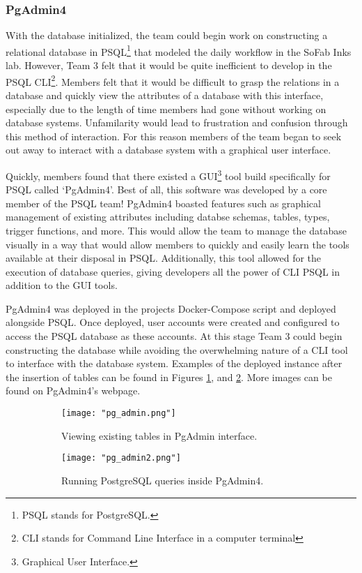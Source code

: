 \documentclass{article}
\begin{document}
\subsubsection{PgAdmin4}
With the database initialized, the team could begin work on constructing a relational database in PSQL\footnote{PSQL stands for PostgreSQL.}
that modeled the daily workflow in the SoFab Inks lab. However, Team 3 felt that it would be quite inefficient to develop in the 
PSQL CLI\footnote{CLI stands for Command Line Interface in a computer terminal}. Members felt that it would be difficult to grasp the 
relations in a database and quickly view the attributes of a database with this interface, especially due to the length of time members
had gone without working on database systems. Unfamilarity would lead to frustration and confusion through this method of interaction. 
For this reason members of the team began to seek out away to interact with a database system with a graphical user interface. 

Quickly, members found that there existed a GUI\footnote{Graphical User Interface.} tool build specifically for PSQL called `PgAdmin4'. 
Best of all, this software was developed by a core member of the PSQL team! PgAdmin4 boasted features such as graphical management of 
existing attributes including databse schemas, tables, types, trigger functions, and more. This would allow the team to manage the 
database visually in a way that would allow members to quickly and easily learn the tools available at their disposal in PSQL. Additionally,
this tool allowed for the execution of database queries, giving developers all the power of CLI PSQL in addition to the GUI tools. 

PgAdmin4 was deployed in the projects Docker-Compose script and deployed alongside PSQL. Once deployed, user accounts were created and 
configured to access the PSQL database as these accounts. At this stage Team 3 could begin constructing the database while avoiding
the overwhelming nature of a CLI tool to interface with the database system. Examples of the deployed instance after the insertion of 
tables can be found in Figures \ref{fig:pg_admin_tables}, and \ref{fig:pg_admin_queries}. More images can be found on PgAdmin4's webpage.
\cite{pgadmin-screenshots}

\begin{figure}[h!]
    \centering
    \begin{subfigure}[b]{.45\textwidth}
        \centering
        \texttt{[image: "pg\_admin.png"]}
        \caption{Viewing existing tables in PgAdmin interface.}
        \label{fig:pg_admin_tables}
    \end{subfigure}
    \begin{subfigure}[b]{.45\textwidth}
        \centering
        \texttt{[image: "pg\_admin2.png"]}
        \caption{Running PostgreSQL queries inside PgAdmin4.}
        \label{fig:pg_admin_queries}
    \end{subfigure}
    \caption{}
    \label{fig:pg_admin_figs}
\end{figure}
\FloatBarrier
\end{document}

